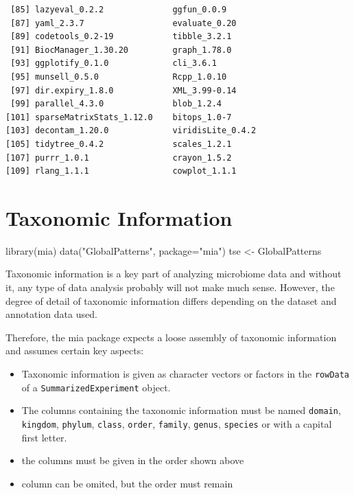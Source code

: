 \documentclass[
]{book}
\newenvironment{Shaded}{\begin{snugshade}}{\end{snugshade}}
\newcommand{\AttributeTok}[1]{\textcolor[rgb]{0.77,0.63,0.00}{#1}}
\newcommand{\FunctionTok}[1]{\textcolor[rgb]{0.00,0.00,0.00}{#1}}
\newcommand{\NormalTok}[1]{#1}
\newcommand{\OtherTok}[1]{\textcolor[rgb]{0.56,0.35,0.01}{#1}}
\newcommand{\StringTok}[1]{\textcolor[rgb]{0.31,0.60,0.02}{#1}}
\providecommand{\tightlist}{%
  \setlength{\itemsep}{0pt}\setlength{\parskip}{0pt}}
\begin{document}
\begin{verbatim}
 [85] lazyeval_0.2.2              ggfun_0.0.9                
 [87] yaml_2.3.7                  evaluate_0.20              
 [89] codetools_0.2-19            tibble_3.2.1               
 [91] BiocManager_1.30.20         graph_1.78.0               
 [93] ggplotify_0.1.0             cli_3.6.1                  
 [95] munsell_0.5.0               Rcpp_1.0.10                
 [97] dir.expiry_1.8.0            XML_3.99-0.14              
 [99] parallel_4.3.0              blob_1.2.4                 
[101] sparseMatrixStats_1.12.0    bitops_1.0-7               
[103] decontam_1.20.0             viridisLite_0.4.2          
[105] tidytree_0.4.2              scales_1.2.1               
[107] purrr_1.0.1                 crayon_1.5.2               
[109] rlang_1.1.1                 cowplot_1.1.1              
\end{verbatim}

\hypertarget{taxonomic-information}{%
\chapter{Taxonomic Information}\label{taxonomic-information}}

\begin{Shaded}
\begin{Highlighting}[]
\FunctionTok{library}\NormalTok{(mia)}
\FunctionTok{data}\NormalTok{(}\StringTok{"GlobalPatterns"}\NormalTok{, }\AttributeTok{package=}\StringTok{"mia"}\NormalTok{)}
\NormalTok{tse }\OtherTok{\textless{}{-}}\NormalTok{ GlobalPatterns }
\end{Highlighting}
\end{Shaded}

Taxonomic information is a key part of analyzing microbiome data and without
it, any type of data analysis probably will not make much sense. However,
the degree of detail of taxonomic information differs depending on the dataset
and annotation data used.

Therefore, the mia package expects a loose assembly of taxonomic information
and assumes certain key aspects:

\begin{itemize}
\tightlist
\item
  Taxonomic information is given as character vectors or factors in the
  \texttt{rowData} of a \texttt{SummarizedExperiment} object.
\item
  The columns containing the taxonomic information must be named \texttt{domain},
  \texttt{kingdom}, \texttt{phylum}, \texttt{class}, \texttt{order}, \texttt{family}, \texttt{genus}, \texttt{species} or with
  a capital first letter.
\item
  the columns must be given in the order shown above
\item
  column can be omited, but the order must remain
\end{itemize}
\end{document}
